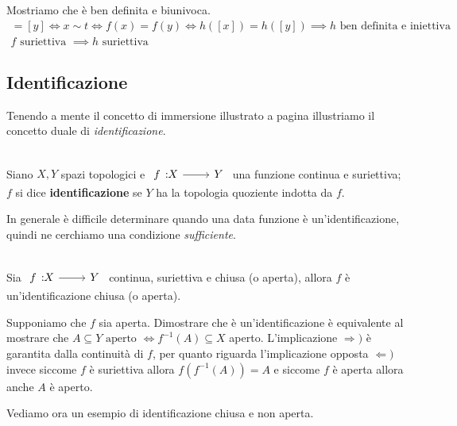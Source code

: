 Mostriamo che è ben definita e biunivoca.
	\begin{gather*}
		[x]=[y]\iff x\sim t\iff f(x)=f(y)\iff h([x])=h([y]) \implies h \text{ ben definita e iniettiva }\\
		f \text{ suriettiva } \implies h \text{ suriettiva}
	\end{gather*}
\subsection{Identificazione}
Tenendo a mente il concetto di immersione illustrato a pagina \pageref{immersione} illustriamo il concetto duale di \textit{identificazione}.
\begin{define}[Identificazione.]~{}\\
	Siano $X,Y$ spazi topologici e $\funz f X Y$ una funzione continua e suriettiva; $f$ si dice \textbf{identificazione} se $Y$ ha la topologia quoziente indotta da $f$.
\end{define}
In generale è difficile determinare quando una data funzione è un'identificazione, quindi ne cerchiamo una condizione \textit{sufficiente}.
\begin{theorema}~{}\label{condizione sufficiente identificazione}\\
Sia $\funz f X Y$ continua, suriettiva e chiusa (o aperta), allora $f$ è un'identificazione chiusa (o aperta).
\end{theorema}
\begin{demonstration}
	Supponiamo che $f$ sia aperta. Dimostrare che è un'identificazione è equivalente al mostrare che $\displaystyle A\subseteq Y \text{ aperto } \iff f^{-1}(A)\subseteq X$ aperto. L'implicazione $\Rightarrow)$ è garantita dalla continuità di $f$, per quanto riguarda l'implicazione opposta $\Leftarrow)$ invece siccome $f$ è suriettiva allora $f(f^{-1}(A))=A$ e siccome $f$ è aperta allora anche $A$ è aperto.
\end{demonstration}
Vediamo ora un esempio di identificazione chiusa e non aperta.
